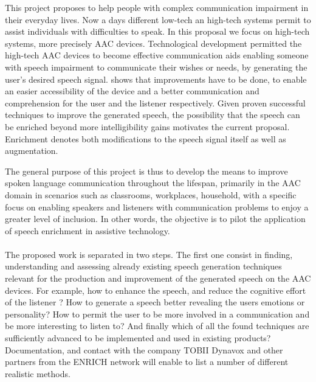 \documentclass[12pt,a4paper,oneside,onecolumn]{article}
\begin{document}
This project proposes to help people with complex communication impairment in their everyday lives. Now a days different low-tech an high-tech systems permit to assist individuals with difficulties to speak. In this proposal we focus on high-tech systems, more precisely AAC devices.
Technological development permitted the high-tech AAC devices to become effective communication aids enabling someone with speech impairment to communicate their wishes or needs, by generating the user's desired speech signal.\cite{higginbotham2007access} shows that improvements have to be done, to enable an easier accessibility of the device and a better communication and comprehension for the user and the listener respectively.
Given proven successful techniques to improve the generated speech, the possibility that the speech can be enriched beyond more intelligibility gains motivates the current proposal. Enrichment denotes both modifications to the speech signal itself as well as augmentation.

The general purpose of this project is thus to develop the means to improve spoken language communication throughout the lifespan, primarily in the AAC domain in scenarios such as classrooms, workplaces, household, with a specific focus on enabling speakers and listeners with communication problems to enjoy a greater level of inclusion. In other words, the objective is to pilot the application of speech enrichment in assistive technology.

\paragraph{}
 
The proposed work is separated in two steps. The first one consist in finding, understanding and assessing already existing speech generation techniques relevant for the production and improvement of the generated speech on the AAC devices. For example, how to enhance the speech, and reduce the cognitive effort of the listener ? \cite{ephraim1984speech}
How to generate a speech better revealing the users emotions or personality? \cite{nass2000does,schroder2001emotional,iida2000speech}
How to permit the user to be more involved in a communication and be more interesting to listen to?
And finally which of all the found techniques are sufficiently advanced to be implemented and used in existing products?
Documentation, and contact with the company TOBII Dynavox and other partners from the ENRICH network will enable to list a number of different realistic methods.
\end{document}
